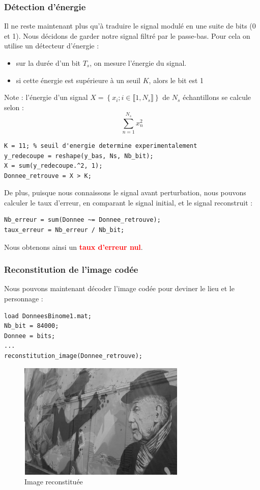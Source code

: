 \subsubsection{Détection d'énergie}
Il ne reste maintenant plus qu'à traduire le signal modulé en une suite de bits (0 et 1).
Nous décidons de garder notre signal filtré par le passe-bas.
Pour cela on utilise un détecteur d'énergie :
\begin{itemize}
   \item sur la durée d'un bit $T_s$, on mesure l'énergie du signal.
   \item si cette énergie est supérieure à un seuil $K$, alors le bit est 1
\end{itemize}
Note : l'énergie d'un signal $X = \left\{x_i ; i\in\llbracket1,N_s\rrbracket\right\}$ de $N_s$ échantillons se calcule selon :
\[
   \sum_{n=1}^{N_s} x_n^2
\]
\begin{lstlisting}[caption=Détection d'énergie]
K = 11; % seuil d'energie determine experimentalement
y_redecoupe = reshape(y_bas, Ns, Nb_bit);
X = sum(y_redecoupe.^2, 1);
Donnee_retrouve = X > K;
\end{lstlisting}
De plus, puisque nous connaissons le signal avant perturbation, nous pouvons calculer le taux d'erreur, en comparant le signal initial, et le signal reconstruit :
\begin{lstlisting}[caption=Taux d'erreur]
Nb_erreur = sum(Donnee ~= Donnee_retrouve);
taux_erreur = Nb_erreur / Nb_bit;
\end{lstlisting}

Nous obtenons ainsi un \textbf{\textcolor{Red}{taux d'erreur nul}}.

\subsubsection{Reconstitution de l'image codée}
Nous pouvons maintenant décoder l'image codée pour deviner le lieu et le personnage :
\begin{lstlisting}[caption=Reconstitution de l'image]
load DonneesBinome1.mat;
Nb_bit = 84000;
Donnee = bits;
...
reconstitution_image(Donnee_retrouve);
\end{lstlisting}
\begin{figure}[H]
   \centering
   \includegraphics[scale=0.4]{partie-2/sous-partie-3/2.3.3.11.png}
   \caption{Image reconstituée} \label{fig:image-reconstituee}
\end{figure}

